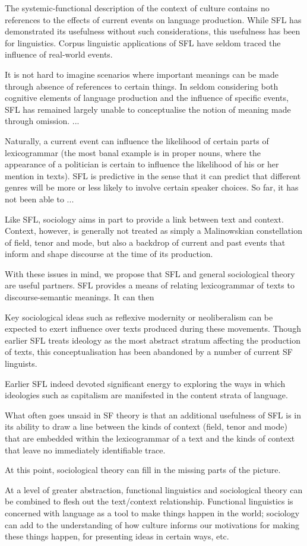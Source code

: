 	The systemic-functional description of the context of culture contains no references to the effects of current events on language production. While SFL has demonstrated its usefulness without such considerations, this usefulness has been for linguistics. Corpus linguistic applications of SFL have seldom traced the influence of real-world events.

            It is not hard to imagine scenarios where important meanings can be made through absence of references to certain things. In seldom considering both cognitive elements of language production and the influence of specific events, SFL has remained largely unable to conceptualise the notion of meaning made through omission. ...

            Naturally, a current event can influence the likelihood of certain parts of lexicogrammar (the most banal example is in proper nouns, where the appearance of a politician is certain to influence the likelihood of his or her mention in texts).  SFL is predictive in the sense that it can predict that different genres will be more or less likely to involve certain speaker choices. So far, it has not been able to ...

	Like SFL, sociology aims in part to provide a link between text and context. Context, however, is generally not treated as simply a Malinowskian constellation of field, tenor and mode, but also a backdrop of current and past events that inform and shape discourse at the time of its production.

	With these issues in mind, we propose that SFL and general sociological theory are useful partners. SFL provides a means of relating lexicogrammar of texts to discourse-semantic meanings. It can then 

            Key sociological ideas such as reflexive modernity or neoliberalism can be expected to exert influence over texts produced during these movements. Though earlier SFL treats ideology as the most abstract stratum affecting the production of texts, this conceptualisation has been abandoned by a number of current SF linguists.

            Earlier SFL indeed devoted significant energy to exploring the ways in which ideologies such as capitalism are manifested in the content strata of language.

	What often goes unsaid in SF theory is that an additional usefulness of SFL is in its ability to draw a line between the kinds of context (field, tenor and mode) that are embedded within the lexicogrammar of a text and the kinds of context that leave no immediately identifiable trace.

	At this point, sociological theory can fill in the missing parts of the picture. 

	At a level of greater abstraction, functional linguistics and sociological theory can be combined to flesh out the text\slash context relationship. Functional linguistics is concerned with language as a tool to make things happen in the world; sociology can add to the understanding of how culture informs our motivations for making these things happen, for presenting ideas in certain ways, etc.

%